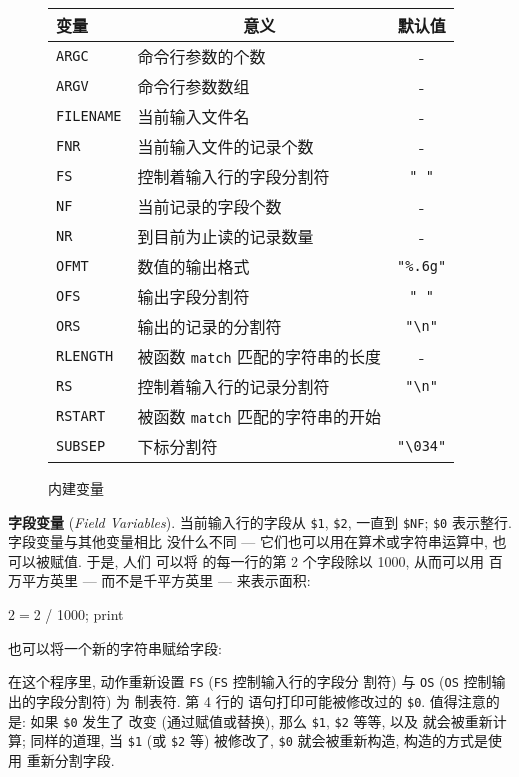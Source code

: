 \begin{figure}[ht]
\captionsetup{type=table}
\caption{内建变量}
\label{tbl:built_in_variables}
\begin{center}
\begin{tabular}{l|l|c}
	\hline
	\hline
	变量	& \multicolumn{1}{c}{意义}	& 默认值 \\
	\hline
	\verb'ARGC'	& 命令行参数的个数	& - \\
	\verb'ARGV'	& 命令行参数数组	& - \\
	\verb'FILENAME'	& 当前输入文件名	& - \\
	\verb'FNR'	& 当前输入文件的记录个数& - \\
	\verb'FS'	& 控制着输入行的字段分割符 & \verb'" "' \\
	\verb'NF'	& 当前记录的字段个数	& - \\
	\verb'NR'	& 到目前为止读的记录数量 & - \\
	\verb'OFMT'	& 数值的输出格式	& \verb'"%.6g"' \\
	\verb'OFS'	& 输出字段分割符	& \verb'" "' \\
	\verb'ORS'	& 输出的记录的分割符	& \verb'"\n"'	\\
	\verb'RLENGTH'	& 被函数 \verb'match' 匹配的字符串的长度 & - \\
	\verb'RS'	& 控制着输入行的记录分割符 & \verb'"\n"'	\\
	\verb'RSTART'	& 被函数 \verb'match' 匹配的字符串的开始 \\
	\verb'SUBSEP'	& 下标分割符	& \verb'"\034"'	\\
	\hline
\end{tabular}
\end{center}
\end{figure}

\textbf{字段变量} (\emph{Field Variables}). 当前输入行的字段从 \verb'$1',
\verb'$2', 一直到 \verb'$NF'; \verb'$0' 表示整行. 字段变量与其他变量相比
没什么不同 --- 它们也可以用在算术或字符串运算中, 也可以被赋值. 于是, 人们
可以将  的每一行的第 2 个字段除以 1000, 从而可以用
百万平方英里 --- 而不是千平方英里 --- 来表示面积:
\begin{awkcode}
    { $2 = $2 / 1000; print }
\end{awkcode}
也可以将一个新的字符串赋给字段:
在这个程序里, \BEGIN 动作重新设置 \verb'FS' (\verb'FS' 控制输入行的字段分
割符) 与 \verb'OS' (\verb'OS' 控制输出的字段分割符) 为 制表符. 第 4 行的
\print 语句打印可能被修改过的 \verb'$0'. 值得注意的是: 如果 \verb'$0' 发生了
改变 (通过赋值或替换), 那么 \verb'$1', \verb'$2' 等等, 以及 \nf
就会被重新计算; 同样的道理, 当 \verb'$1' (或 \verb'$2' 等) 被修改了,
\verb'$0' 就会被重新构造, 构造的方式是使用 \OFS 重新分割字段.

